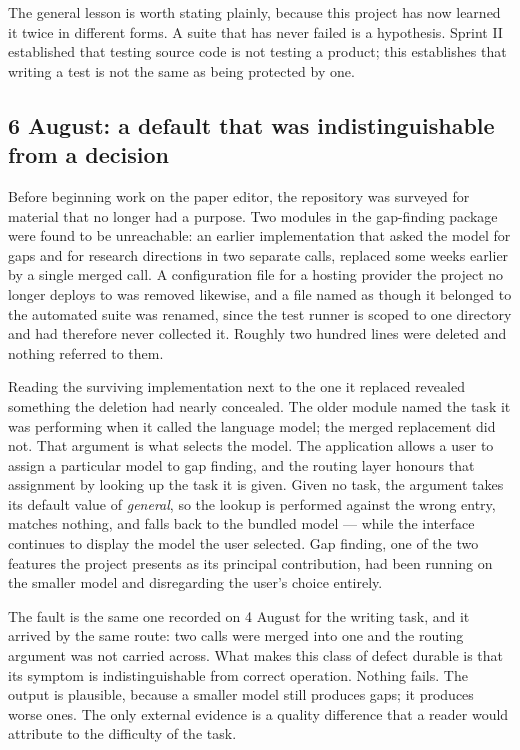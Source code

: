 \documentclass[11pt,a4paper]{article}
\begin{document}
The general lesson is worth stating plainly, because this project has now
learned it twice in different forms. A suite that has never failed is a
hypothesis. Sprint II established that testing source code is not testing a
product; this establishes that writing a test is not the same as being
protected by one.


\subsection{6 August: a default that was indistinguishable from a decision}

Before beginning work on the paper editor, the repository was surveyed for
material that no longer had a purpose. Two modules in the gap-finding package
were found to be unreachable: an earlier implementation that asked the model for
gaps and for research directions in two separate calls, replaced some weeks
earlier by a single merged call. A configuration file for a hosting provider the
project no longer deploys to was removed likewise, and a file named as though it
belonged to the automated suite was renamed, since the test runner is scoped to
one directory and had therefore never collected it. Roughly two hundred lines
were deleted and nothing referred to them.

Reading the surviving implementation next to the one it replaced revealed
something the deletion had nearly concealed. The older module named the task it
was performing when it called the language model; the merged replacement did
not. That argument is what selects the model. The application allows a user to
assign a particular model to gap finding, and the routing layer honours that
assignment by looking up the task it is given. Given no task, the argument takes
its default value of \emph{general}, so the lookup is performed against the
wrong entry, matches nothing, and falls back to the bundled model --- while the
interface continues to display the model the user selected. Gap finding, one of
the two features the project presents as its principal contribution, had been
running on the smaller model and disregarding the user's choice entirely.

The fault is the same one recorded on 4 August for the writing task, and it
arrived by the same route: two calls were merged into one and the routing
argument was not carried across. What makes this class of defect durable is that
its symptom is indistinguishable from correct operation. Nothing fails. The
output is plausible, because a smaller model still produces gaps; it produces
worse ones. The only external evidence is a quality difference that a reader
would attribute to the difficulty of the task.
\end{document}
